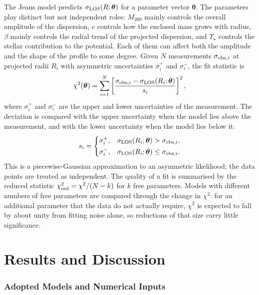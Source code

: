 \documentclass[12pt,a4paper]{report}
\numberwithin{equation}{chapter}
\begin{document}
The Jeans model predicts $\sigma_{\rm LOS}(R;\boldsymbol\theta)$ for a parameter vector $\boldsymbol\theta$. The parameters play distinct but not independent roles: $M_{200}$ mainly controls the overall amplitude of the dispersion, $c$ controls how the enclosed mass grows with radius, $\beta$ mainly controls the radial trend of the projected dispersion, and $\Upsilon_\star$ controls the stellar contribution to the potential. Each of them can affect both the amplitude and the shape of the profile to some degree. Given $N$ measurements $\sigma_{{\rm obs},i}$ at projected radii $R_i$ with asymmetric uncertainties $\sigma_i^{+}$ and $\sigma_i^{-}$, the fit statistic is
\begin{equation}
 \chi^2(\boldsymbol\theta)=\sum_{i=1}^{N}
 \left[\frac{\sigma_{{\rm obs},i}-\sigma_{\rm LOS}(R_i;\boldsymbol\theta)}{s_i}\right]^2,
 \label{eq:fitobjective}
\end{equation}
where $\sigma_i^{+}$ and $\sigma_i^{-}$ are the upper and lower uncertainties of the measurement. The deviation is compared with the upper uncertainty when the model lies above the measurement, and with the lower uncertainty when the model lies below it:
\begin{equation}
 s_i=\begin{cases}
 \sigma_i^{+}, & \sigma_{\rm LOS}(R_i;\boldsymbol\theta)>\sigma_{{\rm obs},i},\\[2pt]
 \sigma_i^{-}, & \sigma_{\rm LOS}(R_i;\boldsymbol\theta)\le\sigma_{{\rm obs},i}.
 \end{cases}
 \label{eq:spliterrors}
\end{equation}
This is a piecewise-Gaussian approximation to an asymmetric likelihood; the data points are treated as independent. The quality of a fit is summarised by the reduced statistic $\chi^2_{\rm red}=\chi^2/(N-k)$ for $k$ free parameters. Models with different numbers of free parameters are compared through the change in $\chi^2$: for an additional parameter that the data do not actually require, $\chi^2$ is expected to fall by about unity from fitting noise alone, so reductions of that size carry little significance.

\chapter{Results and Discussion}

\subsection*{Adopted Models and Numerical Inputs}
\end{document}
